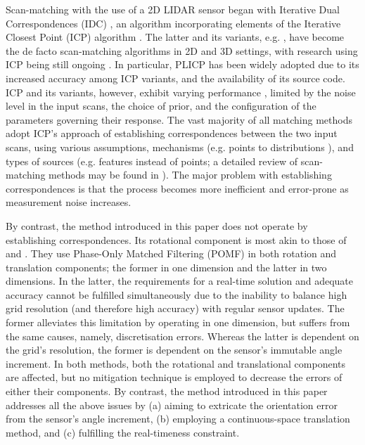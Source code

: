 Scan-matching with the use of a 2D LIDAR sensor began with Iterative Dual
Correspondences (IDC) \cite{FengLu1994}, an algorithm incorporating elements of
the Iterative Closest Point (ICP) algorithm \cite{Besl1992b}. The latter and
its variants, e.g.  \cite{Pfister,Chetverikov,Censi2008b,Segal2009}, have
become the de facto scan-matching algorithms in 2D and 3D settings, with
research using ICP being still ongoing
\cite{Wang2018a,Tian2019a,Marchel2020,Koide2021}. In particular, PLICP
\cite{Censi2008b} has been widely adopted due to its increased accuracy among
ICP variants, and the availability of its source code. ICP and its variants,
however, exhibit varying performance \cite{Donoso2017a}, limited by the noise
level in the input scans, the choice of prior, and the configuration of the
parameters governing their response. The vast majority of all matching methods
adopt ICP's approach of establishing correspondences between the two input
scans, using various assumptions, mechanisms (e.g. points to distributions
\cite{Biber,Bouraine2020}), and types of sources (e.g. features
instead of points; a detailed review of scan-matching methods may be found in
\cite{Filotheou2020a}). The major problem with establishing correspondences is
that the process becomes more inefficient and error-prone as measurement noise
increases.

By contrast, the method introduced in this paper does not operate by
establishing correspondences. Its rotational component is most akin to those of
\cite{Yu2018} and \cite{Jiang2018}. They use Phase-Only Matched Filtering
(POMF) \cite{Qin-ShengChen1994} in both rotation and translation components;
the former in one dimension and the latter in two dimensions. In the latter,
the requirements for a real-time solution and adequate accuracy cannot be
fulfilled simultaneously due to the inability to balance high grid resolution
(and therefore high accuracy) with regular sensor updates. The former
alleviates this limitation by operating in one dimension, but suffers from the
same causes, namely, discretisation errors. Whereas the latter is dependent on
the grid's resolution, the former is dependent on the sensor's immutable angle
increment.  In both methods, both the rotational and translational components
are affected, but no mitigation technique is employed to decrease the errors of
either their components. By contrast, the method introduced in this paper
addresses all the above issues by (a) aiming to extricate the orientation error
from the sensor's angle increment, (b) employing a continuous-space translation
method, and (c) fulfilling the real-timeness constraint.
